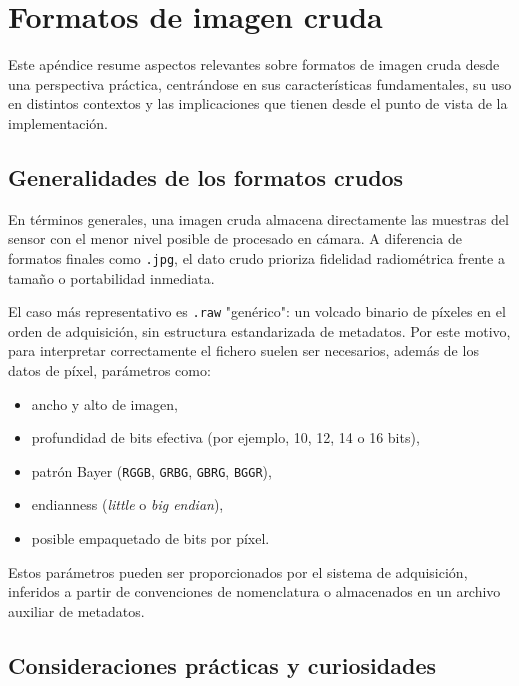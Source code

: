 \section{Formatos de imagen cruda} \label{sec:appendix_D_raw_formats}

Este apéndice resume aspectos relevantes sobre
formatos de imagen cruda desde una perspectiva práctica, centrándose en 
sus características fundamentales, su uso en distintos contextos y las
implicaciones que tienen desde el punto de vista de la implementación.

\subsection{Generalidades de los formatos crudos}

En términos generales, una imagen cruda almacena directamente las muestras del sensor con el menor
nivel posible de procesado en cámara. A diferencia de formatos finales como
\texttt{.jpg}, el dato crudo prioriza fidelidad radiométrica frente a tamaño o
portabilidad inmediata.

El caso más representativo es \texttt{.raw} "genérico": un volcado binario de
píxeles en el orden de adquisición, sin estructura estandarizada de metadatos.
Por este motivo, para interpretar correctamente el fichero suelen ser necesarios,
además de los datos de píxel, parámetros como:

\begin{itemize}[noitemsep]
    \item ancho y alto de imagen,
    \item profundidad de bits efectiva (por ejemplo, 10, 12, 14 o 16 bits),
    \item patrón Bayer (\texttt{RGGB}, \texttt{GRBG}, \texttt{GBRG}, \texttt{BGGR}),
    \item endianness (\textit{little} o \textit{big endian}),
    \item posible empaquetado de bits por píxel.
\end{itemize}

Estos parámetros pueden ser proporcionados por el sistema de adquisición, inferidos a
partir de convenciones de nomenclatura o almacenados en un archivo auxiliar de
metadatos.

\subsection{Consideraciones prácticas y curiosidades}

